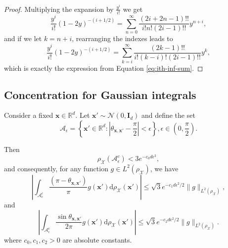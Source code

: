 \begin{proof}
    Multiplying the expansion by $\frac{y^i}{i!}$ we get
    \[
       \frac{y^i}{i!}(1-2y)^{-(i+1/2)}  = \sum_{n=0}^\infty \frac{(2i+2n-1)!!}{i!n!(2i-1)!!}y^{n+i},
    \]
    and if we let $k = n+i$, rearranging the indexes leads to
    \[
       \frac{y^i}{i!}(1-2y)^{-(i+1/2)}  = \sum_{k=i}^\infty \frac{(2k-1)!!}{i!(k-i)!(2i-1)!!}y^k,
    \]
    which is exactly the expression from Equation \ref{eq:ith-inf-sum}.
\end{proof}

\subsection{Concentration for Gaussian integrals}
\begin{lemma}\label{lemma:integral-concentration-1}
    Consider a fixed $\bm x \in \mathbb R^d$. Let $\bm x' \sim \mathcal N(0, \bm I_d)$ and define the set
    \[
        \mathcal A_{\epsilon} = \left\{\bm x' \in \mathbb R^d: \left|\theta_{\bm x, \bm x'} - \frac{\pi}{2}\right|< \epsilon \right\}, \epsilon \in \left(0, \frac{\pi}{2}\right).
    \]

    Then 
    \[
        \rho_{\mathcal X}(\mathcal A^c_{\epsilon}) < 3e^{-c_0d\epsilon^2},
    \]
    and consequently, for any function $g \in L^2(\rho_{\mathcal X})$, we have
    \[
        \left|\int_{\mathcal A^c_{\epsilon}} \frac{(\pi - \theta_{\bm x, \bm x'})}{\pi}g(\bm x')\mathrm d\rho_{\mathcal X}(\bm x')\right| \leq \sqrt {3} e^{-c_1d\epsilon^2/2}\|g\|_{L^2(\rho_{\mathcal X})},
    \]
    and
    \[
        \left|\int_{\mathcal A^c_{\epsilon}} \frac{\sin \theta_{\bm x, \bm x'}}{2\pi}g(\bm x')\mathrm d\rho_{\mathcal X}(\bm x')\right| \leq \sqrt {3} e^{-c_2d\epsilon^2/2}\|g\|_{L^2(\rho_{\mathcal X})}.
    \]
    where $c_0, c_1, c_2 >0$ are absolute constants.
\end{lemma}
